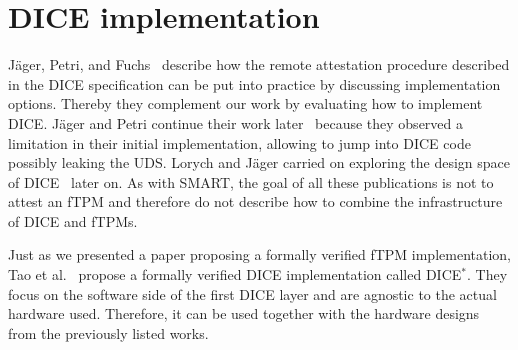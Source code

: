 \section{DICE implementation}

Jäger, Petri, and Fuchs~\cite{Jaeger2017} describe how the remote attestation procedure described in the DICE specification can be put into practice by discussing implementation options.
Thereby they complement our work by evaluating how to implement \ac{DICE}\@.
Jäger and Petri continue their work later~\cite{Jaeger2020} because they observed a limitation in their initial implementation, allowing to jump into \ac{DICE} code possibly leaking the \ac{UDS}.
Lorych and Jäger carried on exploring the design space of DICE~\cite{Lorych2022} later on.
As with SMART, the goal of all these publications is not to attest an \ac{fTPM} and therefore do not describe how to combine the infrastructure of DICE and \acp{fTPM}.

Just as we presented a paper proposing a formally verified \ac{fTPM} implementation, Tao et al.~\cite{272306} propose a formally verified \ac{DICE} implementation called DICE\( ^* \).
They focus on the software side of the first DICE layer and are agnostic to the actual hardware used.
Therefore, it can be used together with the hardware designs from the previously listed works.









